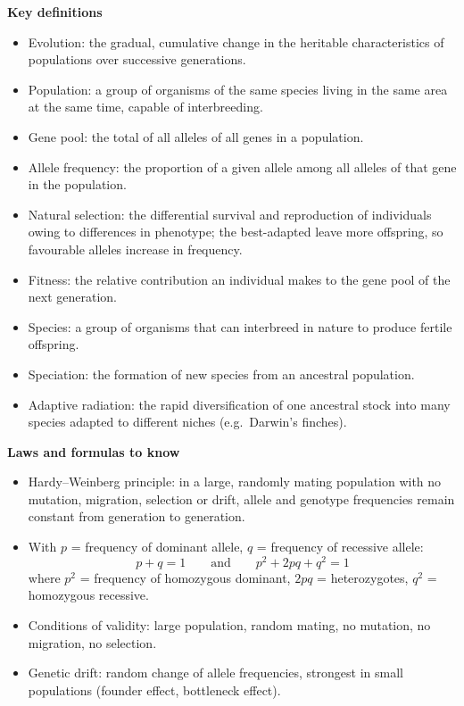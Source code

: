 \documentclass[11pt]{article}
\newcommand{\cle}[1]{{\popxbold\color{popdark}#1}}
\begin{document}
\begin{bilan}
\textbf{Key definitions}\par
\begin{itemize}
\item \cle{Evolution}: the gradual, cumulative change in the heritable characteristics of populations over successive generations.
\item \cle{Population}: a group of organisms of the same species living in the same area at the same time, capable of interbreeding.
\item \cle{Gene pool}: the total of all alleles of all genes in a population.
\item \cle{Allele frequency}: the proportion of a given allele among all alleles of that gene in the population.
\item \cle{Natural selection}: the differential survival and reproduction of individuals owing to differences in phenotype; the best-adapted leave more offspring, so favourable alleles increase in frequency.
\item \cle{Fitness}: the relative contribution an individual makes to the gene pool of the next generation.
\item \cle{Species}: a group of organisms that can interbreed in nature to produce fertile offspring.
\item \cle{Speciation}: the formation of new species from an ancestral population.
\item \cle{Adaptive radiation}: the rapid diversification of one ancestral stock into many species adapted to different niches (e.g.\ Darwin's finches).
\end{itemize}

\textbf{Laws and formulas to know}\par
\begin{itemize}
\item \cle{Hardy--Weinberg principle}: in a large, randomly mating population with no mutation, migration, selection or drift, allele and genotype frequencies remain constant from generation to generation.
\item With $p$ = frequency of dominant allele, $q$ = frequency of recessive allele:
\[ p + q = 1 \qquad\text{and}\qquad p^2 + 2pq + q^2 = 1 \]
where $p^2$ = frequency of homozygous dominant, $2pq$ = heterozygotes, $q^2$ = homozygous recessive.
\item Conditions of validity: large population, random mating, no mutation, no migration, no selection.
\item \cle{Genetic drift}: random change of allele frequencies, strongest in small populations (founder effect, bottleneck effect).
\end{itemize}


\end{bilan}
\end{document}
